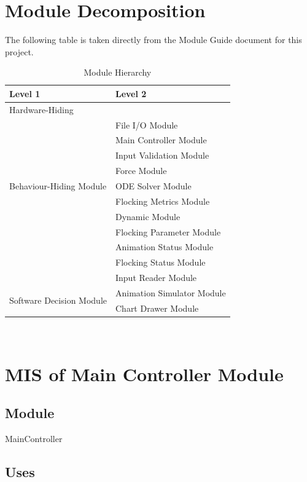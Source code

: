 \documentclass[12pt, titlepage]{article}
\begin{document}
\section{Module Decomposition}

The following table is taken directly from the Module Guide document for this project.

\begin{table}[h!]
\centering
\begin{tabular}{p{} p{}}
\toprule
\textbf{Level 1} & \textbf{Level 2}\\
\midrule

{Hardware-Hiding} & ~ \\
& File I/O Module\\
\midrule

\multirow{7}{0.3\textwidth}{Behaviour-Hiding Module}
& Main Controller Module \\
& Input Validation Module\\
& Force Module \\
& ODE Solver Module\\
& Flocking Metrics Module\\
& Dynamic Module \\
& Flocking Parameter Module \\
& Animation Status Module \\
& Flocking Status Module \\
& Input Reader Module\\
\midrule

\multirow{3}{0.3\textwidth}{Software Decision Module}
& Animation Simulator Module\\ 
& Chart Drawer Module\\
\bottomrule
\end{tabular}
\caption{Module Hierarchy}
\label{TblMH} 
\end{table}

\newpage
~\newpage

\section{MIS of Main Controller Module} \label{mMC}

\subsection{Module}

MainController

\subsection{Uses}
\end{document}
